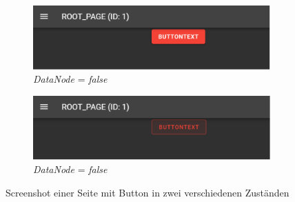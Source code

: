 \begin{figure}[ht]
  \centering
  \begin{subfigure}[b]{\textwidth}
    \centering
    \includegraphics[width=\textwidth]{content/hauptteil/umsetzungPoC/frontend/res/screenPage.pdf}
    \caption{\emph{DataNode}  = \emph{false}}
    \label{fig:frontend:poc:button:true}
  \end{subfigure}
  \hspace{50.00mm}
  \begin{subfigure}[b]{\textwidth}
      \centering
      \includegraphics[width=\textwidth]{content/hauptteil/umsetzungPoC/frontend/res/screenButtonClicked.pdf}
      \caption{\emph{DataNode}  = \emph{false}}
      \label{fig:frontend:poc:button:false}
  \end{subfigure}
  \caption[Screenshot einer Seite mit Button]{Screenshot einer Seite mit Button in zwei verschiedenen Zuständen}
  \label{fig:frontend:poc:button}
\end{figure}

